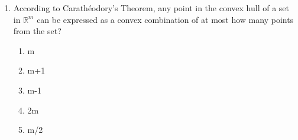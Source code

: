 \documentclass{article}%
\begin{document}
\begin{enumerate}
\begin{enumerate}
\item It directly determines the number of iterations required by the simplex method.%
\item It proves that the simplex method is always efficient.%
\end{enumerate}%
\vspace{1em}%
\item According to Carathéodory's Theorem, any point in the convex hull of a set in $\mathbb{R}^m$ can be expressed as a convex combination of at most how many points from the set?%
\begin{enumerate}%
\item m%
\item m+1%
\item m-1%
\item 2m%
\item m/2%
\end{enumerate}%
\vspace{1em}%
\end{enumerate}

%
\newpage%
\end{document}
